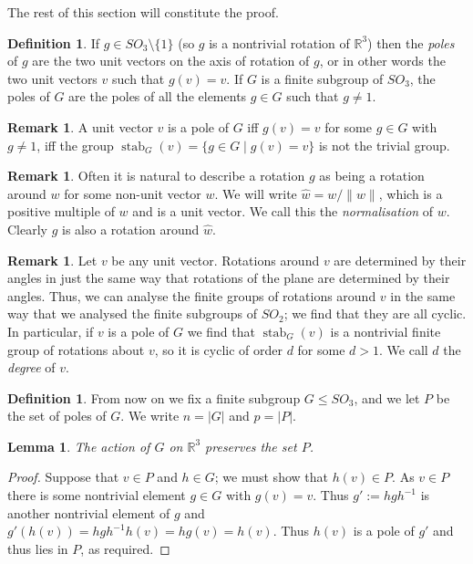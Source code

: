 \documentclass{amsart}
\DeclareMathOperator{\stab}     {stab}
\newcommand{\R}         {{\mathbb{R}}}
\newcommand{\st}        {\;|\;}
\newcommand{\sm}        {\setminus}
\newcommand{\wh}        {\hat{w}}
\renewcommand{\:}{\colon}
\newtheorem{lemma}[theorem]{Lemma}
\theoremstyle{definition}
\newtheorem{remark}[theorem]{Remark}
\newtheorem{definition}[theorem]{Definition}
\begin{document}
The rest of this section will constitute the proof.
\begin{definition}
 If $g\in SO_3\sm\{1\}$ (so $g$ is a nontrivial rotation of $\R^3$)
 then the \emph{poles} of $g$ are the two unit vectors on the axis of
 rotation of $g$, or in other words the two unit vectors $v$ such that
 $g(v)=v$.  If $G$ is a finite subgroup of $SO_3$, the poles of $G$
 are the poles of all the elements $g\in G$ such that $g\neq 1$.
\end{definition}
\begin{remark}
 A unit vector $v$ is a pole of $G$ iff $g(v)=v$ for some $g\in G$
 with $g\neq 1$, iff the group $\stab_G(v)=\{g\in G\st g(v)=v\}$ is
 not the trivial group.
\end{remark}
\begin{remark}
 Often it is natural to describe a rotation $g$ as being a rotation
 around $w$ for some non-unit vector $w$.  We will write
 $\wh=w/\|w\|$, which is a positive multiple of $w$ and is a unit
 vector.  We call this the \emph{normalisation} of $w$.  Clearly $g$
 is also a rotation around $\wh$.
\end{remark}
\begin{remark}
 Let $v$ be any unit vector.  Rotations around $v$ are determined by
 their angles in just the same way that rotations of the plane are
 determined by their angles.  Thus, we can analyse the finite groups
 of rotations around $v$ in the same way that we analysed the finite
 subgroups of $SO_2$; we find that they are all cyclic.  In
 particular, if $v$ is a pole of $G$ we find that $\stab_G(v)$ is a
 nontrivial finite group of rotations about $v$, so it is cyclic of
 order $d$ for some $d>1$.  We call $d$ the \emph{degree} of $v$.
\end{remark}
\begin{definition}
 From now on we fix a finite subgroup $G\leq SO_3$, and we let $P$ be
 the set of poles of $G$.  We write $n=|G|$ and $p=|P|$.
\end{definition}

\begin{lemma}
 The action of $G$ on $\R^3$ preserves the set $P$.
\end{lemma}
\begin{proof}
 Suppose that $v\in P$ and $h\in G$; we must show that $h(v)\in P$.
 As $v\in P$ there is some nontrivial element $g\in G$ with $g(v)=v$.
 Thus $g':=hgh^{-1}$ is another nontrivial element of $g$ and
 $g'(h(v))=hgh^{-1}h(v)=hg(v)=h(v)$.  Thus $h(v)$ is a pole of $g'$
 and thus lies in $P$, as required.
\end{proof}
\end{document}
